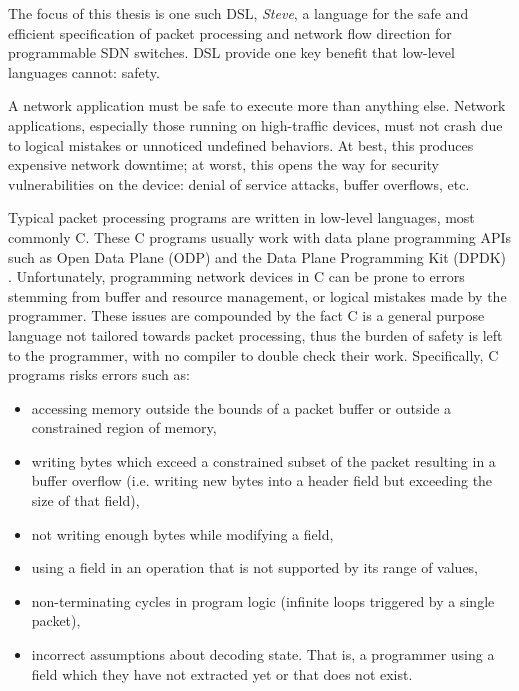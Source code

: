 The focus of this thesis is one such DSL, \emph{Steve}, a language for the safe
and
efficient specification of packet processing and network flow direction
for programmable SDN switches. DSL provide one key benefit that low-level
languages cannot: safety.

A network application must be safe to execute more than anything else.
Network applications, especially those running on high-traffic devices, must not
crash due to logical mistakes or unnoticed undefined behaviors.
At best, this produces expensive network downtime; at worst, this
opens the way for security vulnerabilities on the device: 
denial of service attacks, buffer overflows, etc.

Typical packet processing programs are written in low-level languages, most
commonly C. These C programs usually work with data plane programming APIs such
as Open Data Plane (ODP) \cite{odp_webpage} and the Data Plane Programming Kit
(DPDK) \cite{dpdk_webpage}. Unfortunately, programming network devices in C can be prone
to errors stemming from buffer and resource management, or logical mistakes made by the programmer. 
These issues are compounded by the fact C is a general
purpose language not tailored towards packet processing, thus the burden of
safety
is left to the programmer, with no compiler to double check their work.
Specifically, C programs risks errors such as:

\begin{itemize}
\item accessing memory outside the bounds of a packet buffer or outside a
constrained
region of memory,

\item writing bytes which exceed a constrained subset of the packet
resulting in a buffer overflow (i.e. writing new bytes into a header field
but exceeding the size of that field),

\item not writing enough bytes while modifying a field,

\item using a field in an operation that is not supported by its
range of values,

\item non-terminating cycles in program logic (infinite loops
triggered by a single packet),

\item incorrect assumptions about decoding state. That is, a programmer using
a field which they have not extracted yet or that does not exist.
\end{itemize}

